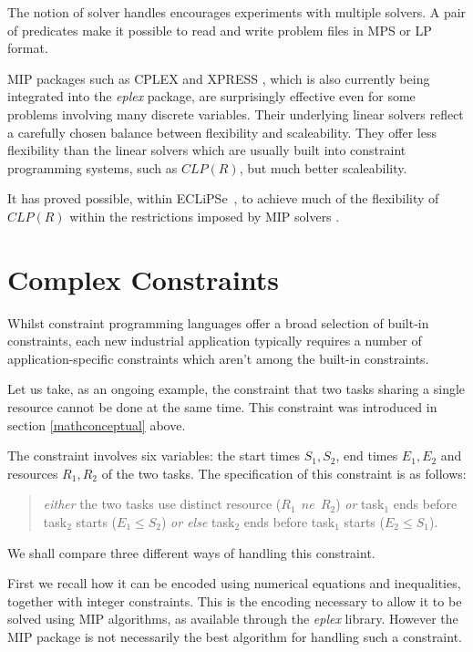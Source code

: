 \documentclass[a4wide]{article}
\newcommand{\ECL}{\mbox{ECLiPSe\ }{\hspace{1mm}}}
\begin{document}
The notion of solver handles encourages experiments with
multiple solvers. 
A pair of predicates make it possible to read and write problem files in MPS
or LP format.  

MIP packages such as CPLEX and XPRESS , which is also
currently being
integrated into the {\em eplex} package, are surprisingly effective
even for some problems involving many discrete variables.
Their underlying linear solvers reflect a carefully chosen balance
between flexibility and scaleability.
They offer less flexibility than the linear solvers which are usually
built 
into constraint programming systems, such as $CLP(R)$, but much better
scaleability. 

It has proved possible, within \ECL, to achieve much of the
flexibility of $CLP(R)$ within the restrictions imposed by
MIP solvers \cite{clpmip}.


\section{Complex Constraints}
\label{complexconstraints}
Whilst constraint programming languages offer a broad selection of
built-in constraints, each new industrial application typically
requires a number of application-specific constraints which aren't
among the built-in constraints.

Let us take, as an ongoing example, the constraint that two tasks sharing a
single resource cannot be done at the same time.
This constraint was introduced in section \ref{mathconceptual}
above. 

The constraint involves six variables: the start times $S_1, S_2$, end times
$E_1, E_2$ and resources $R_1, R_2$ of the two tasks.
The specification of this constraint is as follows:
\begin{quotation}
{\em either} the two tasks use distinct resource ($ R_1 \ \  ne \ \ R_2$)
{\em or} task$_1$ ends before task$_2$ starts ($E_1 \leq S_2$)
{\em or else} task$_2$ ends before task$_1$ starts ($ E_2 \leq S_1$).
\end{quotation}
We shall compare three different ways of handling this constraint.

First we recall how it can be encoded using numerical equations
and inequalities, together with integer constraints. 
This is the encoding necessary to allow it to be solved using MIP
algorithms, as available through the {\em eplex} library.
However the MIP package is not necessarily the
best algorithm for handling such a constraint.
\end{document}
